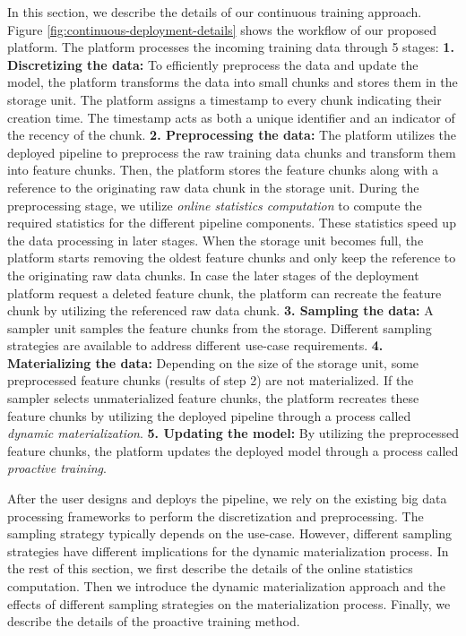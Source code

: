 In this section, we describe the details of our continuous training approach.
Figure \ref{fig:continuous-deployment-details} shows the workflow of our proposed platform.
The platform processes the incoming training data through 5 stages:\newline
\textbf{1. Discretizing the data: } 
To efficiently preprocess the data and update the model, the platform transforms the data into small chunks and stores them in the storage unit. 
The platform assigns a timestamp to every chunk indicating their creation time.
The timestamp acts as both a unique identifier and an indicator of the recency of the chunk.\newline
\textbf{2. Preprocessing the data: } 
The platform utilizes the deployed pipeline to preprocess the raw training data chunks and transform them into feature chunks.
Then, the platform stores the feature chunks along with a reference to the originating raw data chunk in the storage unit.
During the preprocessing stage, we utilize \textit{online statistics computation} to compute the required statistics for the different pipeline components.
These statistics speed up the data processing in later stages.
When the storage unit becomes full, the platform starts removing the oldest feature chunks and only keep the reference to the originating raw data chunks.
In case the later stages of the deployment platform request a deleted feature chunk, the platform can recreate the feature chunk by utilizing the referenced raw data chunk. \newline
\textbf{3. Sampling the data: }
A sampler unit samples the feature chunks from the storage.
Different sampling strategies are available to address different use-case requirements.\newline
\textbf{4. Materializing the data: }
Depending on the size of the storage unit, some preprocessed feature chunks (results of step 2) are not materialized.
If the sampler selects unmaterialized feature chunks, the platform recreates these feature chunks by utilizing the deployed pipeline through a process called \textit{dynamic materialization}.\newline
\textbf{5. Updating the model: }
By utilizing the preprocessed feature chunks, the platform updates the deployed model through a process called \textit{proactive training}.\newline

After the user designs and deploys the pipeline, we rely on the existing big data processing frameworks to perform the discretization and preprocessing.
The sampling strategy typically depends on the use-case.
However, different sampling strategies have different implications for the dynamic materialization process.
In the rest of this section, we first describe the details of the online statistics computation.
Then we introduce the dynamic materialization approach and the effects of different sampling strategies on the materialization process.
Finally, we describe the details of the proactive training method.

